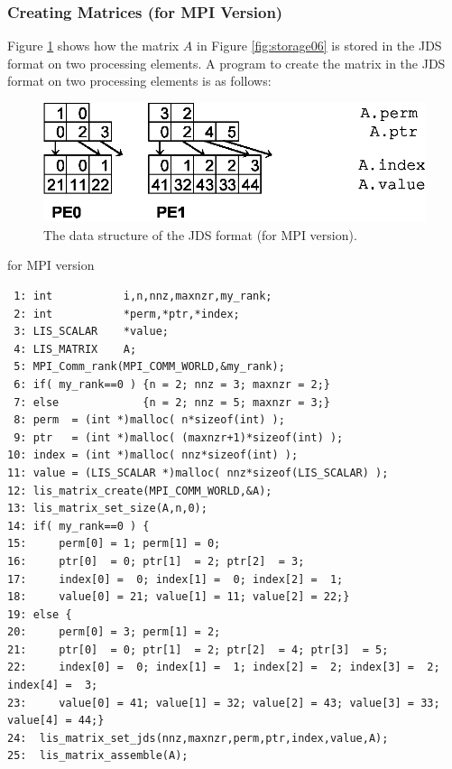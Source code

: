 \documentclass[a4paper]{article}
\begin{document}
\subsubsection{Creating Matrices (for MPI Version)}
Figure \ref{fig:storage06_mpi} shows how the matrix $A$ in Figure \ref{fig:storage06} is stored in the JDS format on two processing elements. A program to create the matrix in the JDS format on two processing elements is as follows:
\begin{figure}[h]
{\centering 
\includegraphics{storage06_mpi.eps} 
\caption{The data structure of the JDS format (for MPI version).}\label{fig:storage06_mpi}}
\end{figure}
\begin{itembox}[l]{for MPI version}
\small
\begin{verbatim}
 1: int           i,n,nnz,maxnzr,my_rank;
 2: int           *perm,*ptr,*index;
 3: LIS_SCALAR    *value;
 4: LIS_MATRIX    A;
 5: MPI_Comm_rank(MPI_COMM_WORLD,&my_rank);
 6: if( my_rank==0 ) {n = 2; nnz = 3; maxnzr = 2;}
 7: else             {n = 2; nnz = 5; maxnzr = 3;}
 8: perm  = (int *)malloc( n*sizeof(int) );
 9: ptr   = (int *)malloc( (maxnzr+1)*sizeof(int) );
10: index = (int *)malloc( nnz*sizeof(int) );
11: value = (LIS_SCALAR *)malloc( nnz*sizeof(LIS_SCALAR) );
12: lis_matrix_create(MPI_COMM_WORLD,&A);
13: lis_matrix_set_size(A,n,0);
14: if( my_rank==0 ) {
15:     perm[0] = 1; perm[1] = 0;
16:     ptr[0]  = 0; ptr[1]  = 2; ptr[2]  = 3;
17:     index[0] =  0; index[1] =  0; index[2] =  1;
18:     value[0] = 21; value[1] = 11; value[2] = 22;}
19: else {
20:     perm[0] = 3; perm[1] = 2;
21:     ptr[0]  = 0; ptr[1]  = 2; ptr[2]  = 4; ptr[3]  = 5;
22:     index[0] =  0; index[1] =  1; index[2] =  2; index[3] =  2; index[4] =  3;
23:     value[0] = 41; value[1] = 32; value[2] = 43; value[3] = 33; value[4] = 44;}
24:  lis_matrix_set_jds(nnz,maxnzr,perm,ptr,index,value,A);
25:  lis_matrix_assemble(A);
\end{verbatim}
\end{itembox}
\end{document}
